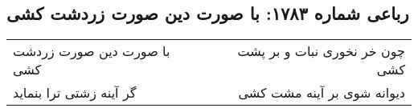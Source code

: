 \begin{center}
\section*{رباعی شماره ۱۷۸۳: با صورت دین صورت زردشت کشی}
\label{sec:1783}
\begin{longtable}{l p{0.5cm} r}
با صورت دین صورت زردشت کشی
&&
چون خر نخوری نبات و بر پشت کشی
\\
گر آینه زشتی ترا بنماید
&&
دیوانه شوی بر آینه مشت کشی
\\
\end{longtable}
\end{center}

